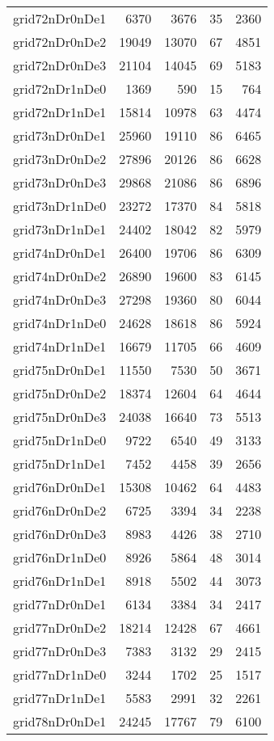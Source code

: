 \begin{longtable}{lrrrr}
grid72nDr0nDe1 & 6370 & 3676 & 35 & 2360 \\
grid72nDr0nDe2 & 19049 & 13070 & 67 & 4851 \\
grid72nDr0nDe3 & 21104 & 14045 & 69 & 5183 \\
grid72nDr1nDe0 & 1369 & 590 & 15 & 764 \\
grid72nDr1nDe1 & 15814 & 10978 & 63 & 4474 \\
grid73nDr0nDe1 & 25960 & 19110 & 86 & 6465 \\
grid73nDr0nDe2 & 27896 & 20126 & 86 & 6628 \\
grid73nDr0nDe3 & 29868 & 21086 & 86 & 6896 \\
grid73nDr1nDe0 & 23272 & 17370 & 84 & 5818 \\
grid73nDr1nDe1 & 24402 & 18042 & 82 & 5979 \\
grid74nDr0nDe1 & 26400 & 19706 & 86 & 6309 \\
grid74nDr0nDe2 & 26890 & 19600 & 83 & 6145 \\
grid74nDr0nDe3 & 27298 & 19360 & 80 & 6044 \\
grid74nDr1nDe0 & 24628 & 18618 & 86 & 5924 \\
grid74nDr1nDe1 & 16679 & 11705 & 66 & 4609 \\
grid75nDr0nDe1 & 11550 & 7530 & 50 & 3671 \\
grid75nDr0nDe2 & 18374 & 12604 & 64 & 4644 \\
grid75nDr0nDe3 & 24038 & 16640 & 73 & 5513 \\
grid75nDr1nDe0 & 9722 & 6540 & 49 & 3133 \\
grid75nDr1nDe1 & 7452 & 4458 & 39 & 2656 \\
grid76nDr0nDe1 & 15308 & 10462 & 64 & 4483 \\
grid76nDr0nDe2 & 6725 & 3394 & 34 & 2238 \\
grid76nDr0nDe3 & 8983 & 4426 & 38 & 2710 \\
grid76nDr1nDe0 & 8926 & 5864 & 48 & 3014 \\
grid76nDr1nDe1 & 8918 & 5502 & 44 & 3073 \\
grid77nDr0nDe1 & 6134 & 3384 & 34 & 2417 \\
grid77nDr0nDe2 & 18214 & 12428 & 67 & 4661 \\
grid77nDr0nDe3 & 7383 & 3132 & 29 & 2415 \\
grid77nDr1nDe0 & 3244 & 1702 & 25 & 1517 \\
grid77nDr1nDe1 & 5583 & 2991 & 32 & 2261 \\
grid78nDr0nDe1 & 24245 & 17767 & 79 & 6100 \\

\end{longtable}
